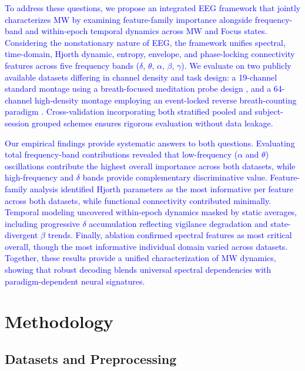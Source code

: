 \documentclass[conference]{IEEEtran}
\begin{document}
\textcolor{blue}{To address these questions, we propose an integrated EEG framework that jointly characterizes MW by examining feature-family importance alongside frequency-band and within-epoch temporal dynamics across MW and Focus states. Considering the nonstationary nature of EEG, the framework unifies spectral, time-domain, Hjorth dynamic, entropy, envelope, and phase-locking connectivity features across five frequency bands ($\delta$, $\theta$, $\alpha$, $\beta$, $\gamma$). We evaluate on two publicly available datasets differing in channel density and task design: a 19-channel standard montage using a breath-focused meditation probe design \cite{rodlarios}, and a 64-channel high-density montage employing an event-locked reverse breath-counting paradigm \cite{grandchamp2014oculometric}. Cross-validation incorporating both stratified pooled and subject-session grouped schemes ensures rigorous evaluation without data leakage.}

\textcolor{blue}{Our empirical findings provide systematic answers to both questions. Evaluating total frequency-band contributions revealed that low-frequency ($\alpha$ and $\theta$) oscillations contribute the highest overall importance across both datasets, while high-frequency and $\delta$ bands provide complementary discriminative value. Feature-family analysis identified Hjorth parameters as the most informative per feature across both datasets, while functional connectivity contributed minimally. Temporal modeling uncovered within-epoch dynamics masked by static averages, including progressive $\delta$ accumulation reflecting vigilance degradation and state-divergent $\beta$ trends. Finally, ablation confirmed spectral features as most critical overall, though the most informative individual domain varied across datasets. Together, these results provide a unified characterization of MW dynamics, showing that robust decoding blends universal spectral dependencies with paradigm-dependent neural signatures.}

\section{Methodology}

\subsection{Datasets and Preprocessing}
\end{document}
